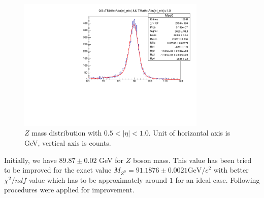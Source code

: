 \begin{figure}[h]
    \centering
	\includegraphics[width=0.8\textwidth]{../figures/eta_05-1_bin.pdf}
	\caption{$Z$ mass distribution with $0.5<|\eta|<1.0$. Unit of horizantal axis is GeV, vertical axis is counts.}
    \label{fig:eta05-1bin}
\end{figure}
\FloatBarrier

Initially, we have $ 89.87\pm0.02 $ GeV for $Z$ boson mass. This value has been tried to be improved for the exact value $M_{Z^0} = 91.1876 \pm 0.0021 \text{GeV/$c^2$}$\cite{pdg2018} with better $\chi^2 / ndf$ value which has to be approximately around $1$ for an ideal case. Following procedures were applied for improvement.

